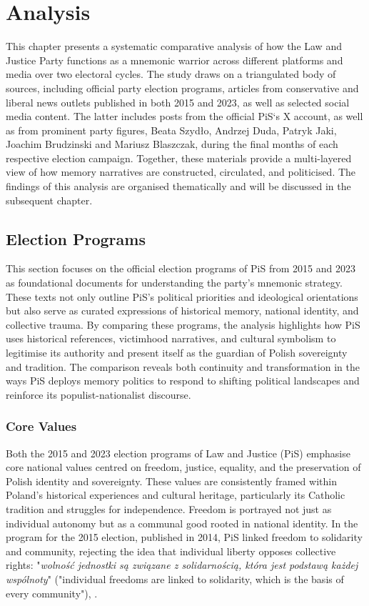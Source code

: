 \chapter[Analysis]{Analysis}
\label{Chap:Analysis}

This chapter presents a systematic comparative analysis of how the Law and Justice Party functions as a mnemonic warrior across different platforms and media over two electoral cycles. The study draws on a triangulated body of sources, including official party election programs, articles from conservative and liberal news outlets published in both 2015 and 2023, as well as selected social media content. The latter includes posts from the official PiS`s  X account, as well as from prominent party figures, Beata Szydło, Andrzej Duda, Patryk Jaki, Joachim Brudzinski and Mariusz Blaszczak, during the final months of each respective election campaign. Together, these materials provide a multi-layered view of how memory narratives are constructed, circulated, and politicised. The findings of this analysis are organised thematically and will be discussed in the subsequent chapter.

\section{Election Programs}

This section focuses on the official election programs of PiS from 2015 and 2023 as foundational documents for understanding the party's mnemonic strategy. These texts not only outline PiS's political priorities and ideological orientations but also serve as curated expressions of historical memory, national identity, and collective trauma. By comparing these programs, the analysis highlights how PiS uses historical references, victimhood narratives, and cultural symbolism to legitimise its authority and present itself as the guardian of Polish sovereignty and tradition. The comparison reveals both continuity and transformation in the ways PiS deploys memory politics to respond to shifting political landscapes and reinforce its populist-nationalist discourse.

\subsection{Core Values}

Both the 2015 and 2023 election programs of Law and Justice (PiS) emphasise core national values centred on freedom, justice, equality, and the preservation of Polish identity and sovereignty. These values are consistently framed within Poland's historical experiences and cultural heritage, particularly its Catholic tradition and struggles for independence.
Freedom is portrayed not just as individual autonomy but as a communal good rooted in national identity. In the program for the 2015 election, published in 2014, PiS linked freedom to solidarity and community, rejecting the idea that individual liberty opposes collective rights: "\textit{wolność jednostki są związane z solidarnością, która jest podstawą każdej wspólnoty}" ("individual freedoms are linked to solidarity, which is the basis of every community"),  \citep{pis_program_2014}.

